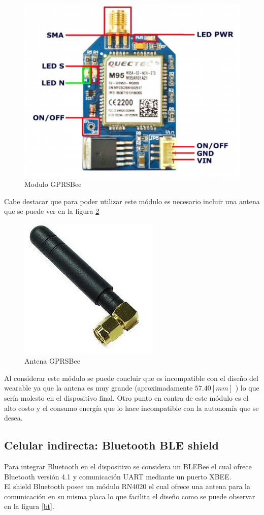 \begin{figure}[H]
	\centering
	\includegraphics[scale=0.8]{figuras/com/gprs.png}
	\caption{Modulo GPRSBee}
	\label{gprs}
\end{figure}

Cabe destacar que para poder utilizar este módulo es necesario incluir una antena que se puede ver en la figura \ref{antena}

\begin{figure}[H]
	\centering
	\includegraphics[scale=0.5]{figuras/com/antena.jpg}
	\caption{Antena GPRSBee}
	\label{antena}
\end{figure}

Al considerar este módulo se puede concluir que es incompatible con el diseño del wearable ya que la antena es muy grande (aproximadamente $57.40[mm]$ ) lo que sería molesto en el dispositivo final. Otro punto en contra de este módulo es el alto costo y el consumo energía que lo hace incompatible con la autonomía que se desea.

\subsection{Celular indirecta: Bluetooth BLE shield}
Para integrar Bluetooth en el dispositivo se considera un BLEBee el cual ofrece Bluetooth versión 4.1 y comunicación UART mediante un puerto XBEE. \\
El shield Bluetooth posee un módulo RN4020\cite{RN4020} el cual ofrece una antena para la comunicación en su misma placa lo que facilita el diseño como se puede observar en la figura \ref{bt}.

